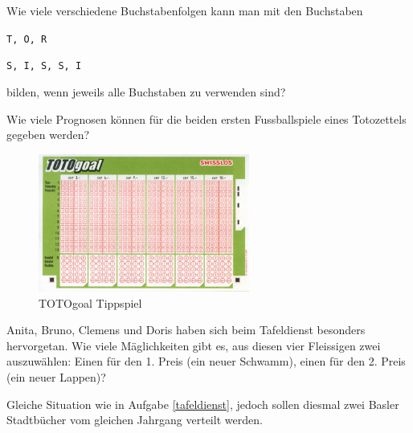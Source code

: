 \documentclass[%
11pt,%
twoside,%
titlepage,%
german,%
headsepline%
]{scrartcl}
\begin{document}
\begin{ueb}\label{sissi}
Wie viele verschiedene Buchstabenfolgen kann man mit den Buchstaben
\begin{enumeratea}
\item \texttt{T, O, R}
\item \texttt{S, I, S, S, I}
\end{enumeratea}
bilden, wenn jeweils alle Buchstaben zu verwenden sind?
\end{ueb}

\begin{ueb}[TOTOGoal]
Wie viele Prognosen können für die beiden ersten Fussballspiele eines Totozettels gegeben werden?
\begin{figure}
\begin{center}
\includegraphics[width=0.618\textwidth]{pictures/TotoGoal}
\caption{TOTOgoal Tippspiel}
\end{center}
\end{figure}
\end{ueb}

\begin{ueb}[Tafeldienst]\label{tafeldienst}
Anita, Bruno, Clemens und Doris haben sich beim Tafeldienst besonders hervorgetan. Wie viele Mäglichkeiten gibt es, aus diesen vier Fleissigen zwei auszuwählen: Einen für den 1. Preis (ein neuer Schwamm), einen für den 2. Preis (ein neuer Lappen)?
\end{ueb}

\begin{ueb}[Chroniken]
Gleiche Situation wie in Aufgabe \ref{tafeldienst}, jedoch sollen diesmal zwei Basler Stadtbücher vom gleichen Jahrgang verteilt werden.
\end{ueb}
\end{document}
